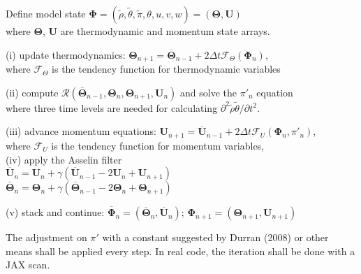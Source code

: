 \documentclass[a4paper,11pt]{article}
\begin{document}
\begin{algorithm}
\begin{tcolorbox}[parbox=false, width=38em]

    Define model state $\mathbf{\Phi} = (\tilde{\rho},\tilde{\theta},\tilde{\pi},\theta,u,v,w) = (\mathbf{\Theta}, \mathbf{U})$\\[-1ex]         
    \qquad where $\mathbf{\Theta}$, $\mathbf{U}$ are thermodynamic and momentum state arrays.\\
    
     {
        (i) update thermodynamics: $\mathbf{\Theta}_{n+1} = \overline{\mathbf{\Theta}}_{n-1} + 2\Delta t \mathcal{F}_{\Theta}(\mathbf{\Phi}_n)$,\\[-1ex]
        \qquad where $\mathcal{F}_{\Theta}$ is the tendency function for thermodynamic variables%
        
        (ii) compute $\mathcal{R}(\overline{\mathbf{\Theta}}_{n-1}, \mathbf{\Theta}_{n}, \mathbf{\Theta}_{n+1}, \mathbf{U}_n)$ and solve the $\pi'_{n}$ equation\\[-1ex]
        \qquad where three time levels are needed for calculating $\partial^2\tilde{\rho}\tilde{\theta}/\partial t^2$. 
        
        (iii) advance momentum equations: $\mathbf{U}_{n+1} = \overline{\mathbf{U}}_{n-1} + 2\Delta t \mathcal{F}_{U}(\mathbf{\Phi}_n, \pi'_n)$,\\[-1ex]
        \qquad  where $\mathcal{F}_{U}$ is the tendency function for momentum variables,\\[-1ex]
        
        (iv) apply the Asselin filter\\[-1ex] 
\qquad $\overline{\mathbf{U}}_n = \mathbf{U}_n + \gamma (\overline{\mathbf{U}}_{n-1} - 2\mathbf{U}_n + \mathbf{U}_{n+1})$\\[-1ex]    
\qquad $\overline{\mathbf{\Theta}}_n = \mathbf{\Theta}_n + \gamma (\overline{\mathbf{\Theta}}_{n-1} - 2\mathbf{\Theta}_n + \mathbf{\Theta}_{n+1})$        

        (v) stack and continue: $\overline{\mathbf{\Phi}}_n = (\overline{\mathbf{\Theta}}_n, \overline{\mathbf{U}}_n)$; $\mathbf{\Phi}_{n+1} = (\mathbf{\Theta}_{n+1}, \mathbf{U}_{n+1})$
        }        
\end{tcolorbox}    
\end{algorithm}


The adjustment on $\pi'$ with a constant suggested by Durran (2008) or other means shall be applied every step. In real code, the iteration shall be done with a JAX \textsf{scan}.
\end{document}
